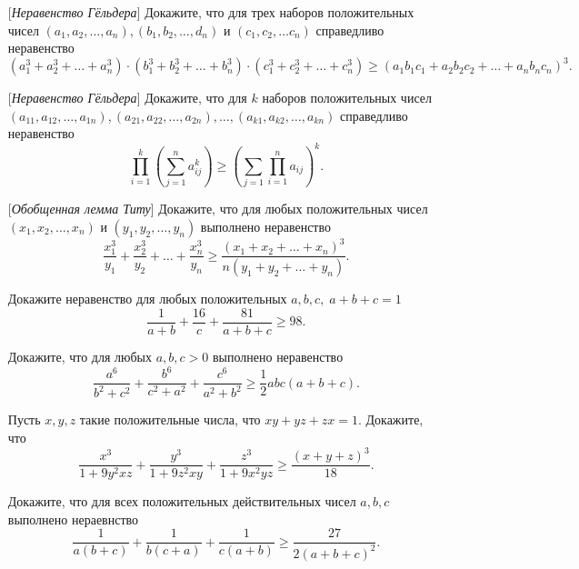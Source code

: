 \documentclass[a4paper,12pt,leqno]{article}
\theoremstyle{plain} %
\theoremstyle{definition} %
\theoremstyle{remark} %
\begin{document}
	\begin{enumerate}
		
		\item[\z] [\textit{Неравенство Гёльдера}] Докажите, что для трех наборов положительных чисел $(a_1, a_2, \dots , a_n),  (b_1, b_2, \dots , d_n)$ и $(c_1, c_2, \dots c_n)$ справедливо неравенство
		$$(a_1^3 + a_2^3 + \dots + a_n^3) \cdot (b_1^3 + b_2^3 + \dots + b_n^3) \cdot (c_1^3 + c_2^3 + \dots + c_n^3) \geqslant (a_1b_1c_1 + a_2b_2c_2 + \dots + a_nb_nc_n)^3.$$
		
		\item[\z] [\textit{Неравенство Гёльдера}] Докажите, что для $k$ наборов положительных чисел $(a_{11}, a_{12}, \dots , a_{1n}), (a_{21}, a_{22}, \dots , a_{2n}), \dots , (a_{k1}, a_{k2}, \dots , a_{kn})$ справедливо неравенство
		$$\prod\limits_{i = 1}^{k} \left(\sum\limits_{j = 1}^n a_{ij}^k \right) \geqslant \left( \sum\limits_{j = 1} \prod\limits_{i = 1}^n a_{ij} \right)^k .$$
		
		\item[\z] [\textit{Обобщенная лемма Титу}] Докажите, что для любых положительных чисел $(x_1, x_2, \dots , x_n)$ и $(y_1, y_2, \dots, y_n)$ выполнено неравенство $$\frac{x_1^3}{y_1} +\frac{x_2^3}{y_2} + \dots + \frac{x_n^3}{y_n} \geqslant \frac{(x_1 + x_2 + \dots + x_n)^3}{n(y_1 + y_2 + \dots + y_n)}.$$
		
		\item[\z] Докажите неравенство для любых положительных $a, b, c, \; a+b+c = 1$ $$\frac{1}{a+b} + \frac{16}{c} + \frac{81}{a+b+c} \geqslant 98.$$
		\item[\z] Докажите, что для любых $a, b, c > 0$ выполнено неравенство $$\frac{a^6}{b^2+c^2} + \frac{b^6}{c^2+a^2} + \frac{c^6}{a^2+b^2} \geqslant \frac{1}{2}abc(a+b+c).$$
		\item[\z] Пусть $x, y, z$ такие положительные числа, что $xy + yz +zx = 1$. Докажите, что $$\frac{x^3}{1+9y^2xz} + \frac{y^3}{1+9z^2xy} + \frac{z^3}{1+9x^2yz} \geqslant \frac{(x+y+z)^3}{18}.$$
		
		
		\item[\z] Докажите, что для всех положительных действительных чисел $a, b, c$ выполнено нераевнство $$\frac{1}{a(b+c)} + \frac{1}{b(c+a)} + \frac{1}{c(a+b)} \geqslant \frac{27}{2(a+b+c)^2}.$$
		
		
	\end{enumerate}
	
	
	
	
	
	
	
	
	
	
	
	
	
	
	
	
	
	
	
	
	
	
	
	
	
	
	
	
\end{document}

